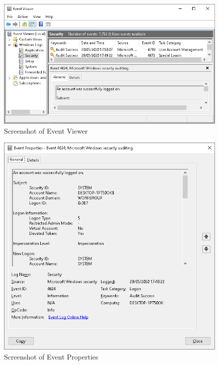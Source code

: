 \begin{figure}[htbp]  %
  \centering
  \includegraphics[width=\textwidth]{figures/event-viewer.png}
  \caption[Screenshot of Event Viewer]{Screenshot of Event Viewer}
  \label{fig:event-viewer}
\end{figure}

\begin{figure}[htbp]  %
  \centering
  \includegraphics[width=\textwidth]{figures/event-properties.png}
  \caption[Screenshot of Event Properties]{Screenshot of Event Properties}
  \label{fig:event-properties}
\end{figure}

